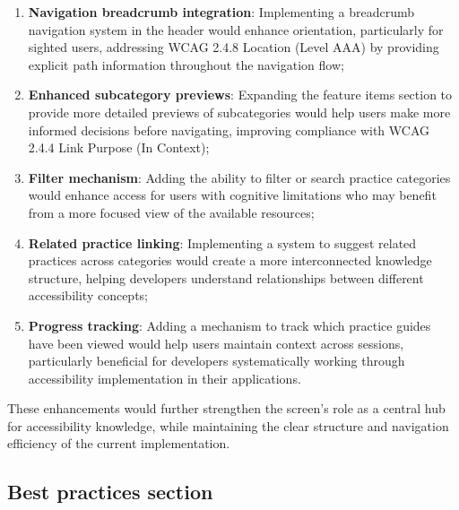 \begin{enumerate}
    \item \textbf{Navigation breadcrumb integration}: Implementing a breadcrumb navigation system in the header would enhance orientation, particularly for sighted users, addressing WCAG 2.4.8 Location (Level AAA) by providing explicit path information throughout the navigation flow;
    
    \item \textbf{Enhanced subcategory previews}: Expanding the feature items section to provide more detailed previews of subcategories would help users make more informed decisions before navigating, improving compliance with WCAG 2.4.4 Link Purpose (In Context);
    
    \item \textbf{Filter mechanism}: Adding the ability to filter or search practice categories would enhance access for users with cognitive limitations who may benefit from a more focused view of the available resources;
    
    \item \textbf{Related practice linking}: Implementing a system to suggest related practices across categories would create a more interconnected knowledge structure, helping developers understand relationships between different accessibility concepts;
    
    \item \textbf{Progress tracking}: Adding a mechanism to track which practice guides have been viewed would help users maintain context across sessions, particularly beneficial for developers systematically working through accessibility implementation in their applications.
\end{enumerate}

These enhancements would further strengthen the screen's role as a central hub for accessibility knowledge, while maintaining the clear structure and navigation efficiency of the current implementation.

\subsection{Best practices section}

\newpage

